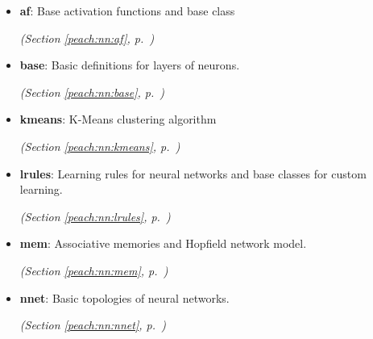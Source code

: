 \begin{itemize}
\setlength{\parskip}{0ex}
\item \textbf{af}: 
Base activation functions and base class


  \textit{(Section \ref{peach:nn:af}, p.~\pageref{peach:nn:af})}

\item \textbf{base}: 
Basic definitions for layers of neurons.


  \textit{(Section \ref{peach:nn:base}, p.~\pageref{peach:nn:base})}

\item \textbf{kmeans}: 
K-Means clustering algorithm


  \textit{(Section \ref{peach:nn:kmeans}, p.~\pageref{peach:nn:kmeans})}

\item \textbf{lrules}: 
Learning rules for neural networks and base classes for custom learning.


  \textit{(Section \ref{peach:nn:lrules}, p.~\pageref{peach:nn:lrules})}

\item \textbf{mem}: 
Associative memories and Hopfield network model.


  \textit{(Section \ref{peach:nn:mem}, p.~\pageref{peach:nn:mem})}

\item \textbf{nnet}: 
Basic topologies of neural networks.


  \textit{(Section \ref{peach:nn:nnet}, p.~\pageref{peach:nn:nnet})}

\end{itemize}

